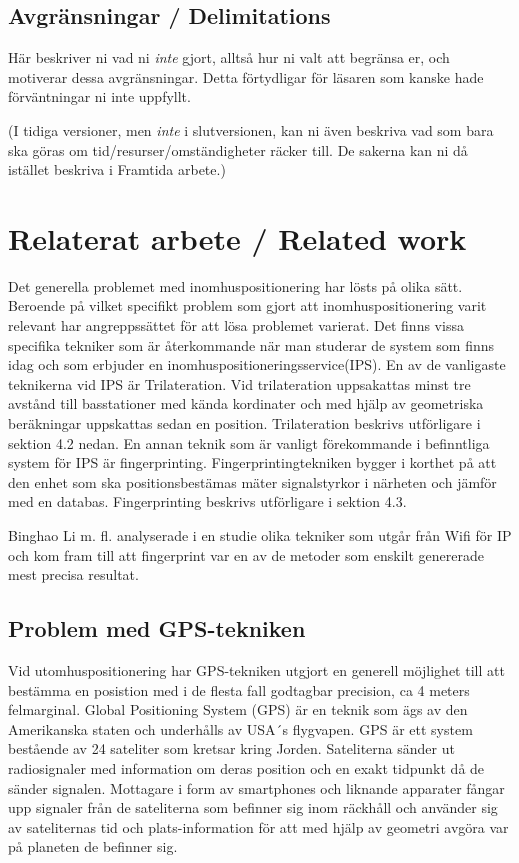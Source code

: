 \documentclass[a4paper,12pt]{article}
\begin{document}
\subsection{Avgränsningar / Delimitations}
Här beskriver ni vad ni \emph{inte} gjort, alltså hur ni valt att begränsa er, och motiverar dessa avgränsningar. Detta förtydligar för läsaren som kanske hade förväntningar ni inte uppfyllt.

(I tidiga versioner, men \emph{inte} i slutversionen, kan ni även beskriva vad som bara ska göras om tid/resurser/omständigheter räcker till. De sakerna kan ni då istället beskriva i Framtida arbete.)

\section{Relaterat arbete / Related work}
Det generella problemet med inomhuspositionering har lösts på olika sätt.
Beroende på vilket specifikt problem som gjort att inomhuspositionering varit relevant har angreppssättet för att lösa problemet varierat. Det finns vissa specifika tekniker som är återkommande när man studerar de system som finns idag och som erbjuder en inomhuspositioneringsservice(IPS)\cite{IP1}.
En av de vanligaste teknikerna vid IPS är Trilateration. Vid trilateration uppsakattas minst tre avstånd till basstationer med kända kordinater och med hjälp av geometriska beräkningar uppskattas sedan en position. Trilateration beskrivs utförligare i sektion 4.2 nedan. En annan teknik som är vanligt förekommande i befinntliga system för IPS är fingerprinting. Fingerprintingtekniken bygger i korthet på att den enhet som ska positionsbestämas mäter signalstyrkor i närheten och jämför med en databas. Fingerprinting beskrivs utförligare i sektion 4.3.

Binghao Li m. fl. analyserade i en studie \cite{IP1} olika tekniker som utgår från Wifi  för IP och kom fram till att fingerprint var en av de metoder som enskilt genererade mest precisa resultat.


\subsection{Problem med GPS-tekniken}
Vid utomhuspositionering har GPS-tekniken utgjort en generell möjlighet till att bestämma en posistion med i de flesta fall godtagbar precision, ca 4 meters felmarginal\cite{GPS_US_ACCURACY}.
Global Positioning System (GPS) är en teknik som ägs av den Amerikanska staten och underhålls av USA´s flygvapen. GPS är ett system bestående av 24 sateliter som kretsar kring Jorden. Sateliterna sänder ut radiosignaler med information om deras position och en exakt tidpunkt då de sänder signalen. Mottagare i form av smartphones och liknande apparater fångar upp signaler från de sateliterna som befinner sig inom räckhåll och använder sig av sateliternas tid och plats-information för att med hjälp av geometri avgöra var på planeten de befinner sig.\cite{GPS_US_HOW}
\end{document}
